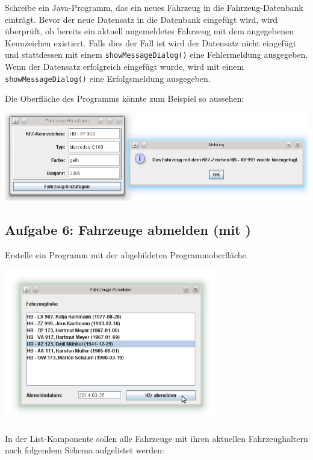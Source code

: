 Schreibe ein Java-Programm, das ein neues Fahrzeug in die Fahrzeug-Datenbank
einträgt. Bevor der neue Datensatz in die Datenbank eingefügt wird, wird
überprüft, ob bereits ein aktuell angemeldetes Fahrzeug mit dem angegebenen
Kennzeichen existiert. Falls dies der Fall ist wird der Datensatz nicht
eingefügt und stattdessen mit einem \lstinline|showMessageDialog()| eine
Fehlermeldung ausgegeben. Wenn der Datensatz erfolgreich eingefügt wurde, wird
mit einem \lstinline|showMessageDialog()| eine Erfolgsmeldung ausgegeben.

Die Oberfläche des Programms könnte zum Beispiel so aussehen:

\begin{center}
\includegraphics[width=1.0\textwidth]{./inf/SEKII/44_Abi-Training/FahrzeugeHinzufuegen.png}
\end{center}


\subsection{Aufgabe 6: Fahrzeuge abmelden (mit )}

Erstelle ein Programm mit der abgebildeten Programmoberfläche.

\begin{center}
\includegraphics[width=0.7\textwidth]{./inf/SEKII/44_Abi-Training/FahrzeugeAbmeldenMitJList.png}
\end{center}

In der List-Komponente sollen alle Fahrzeuge mit ihren aktuellen
Fahrzeughaltern nach folgendem Schema aufgelistet werden:

